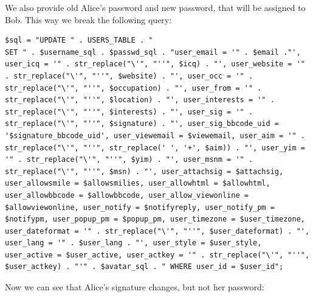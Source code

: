 \documentclass[12pt, a4paper]{article}
\begin{document}
We also provide old Alice's password and new password, that will be assigned to Bob. This way we break the following query:
\lstset{
	captionpos=b,
	frame=single,
	language=PHP,
	breaklines=true,
	label=sql12
}
\begin{lstlisting}
$sql = "UPDATE " . USERS_TABLE . "
SET " . $username_sql . $passwd_sql . "user_email = '" . $email ."', user_icq = '" . str_replace("\'", "''", $icq) . "', user_website = '" . str_replace("\'", "''", $website) . "', user_occ = '" . str_replace("\'", "''", $occupation) . "', user_from = '" . str_replace("\'", "''", $location) . "', user_interests = '" . str_replace("\'", "''", $interests) . "', user_sig = '" . str_replace("\'", "''", $signature) . "', user_sig_bbcode_uid = '$signature_bbcode_uid', user_viewemail = $viewemail, user_aim = '" . str_replace("\'", "''", str_replace(' ', '+', $aim)) . "', user_yim = '" . str_replace("\'", "''", $yim) . "', user_msnm = '" . str_replace("\'", "''", $msn) . "', user_attachsig = $attachsig, user_allowsmile = $allowsmilies, user_allowhtml = $allowhtml, user_allowbbcode = $allowbbcode, user_allow_viewonline = $allowviewonline, user_notify = $notifyreply, user_notify_pm = $notifypm, user_popup_pm = $popup_pm, user_timezone = $user_timezone, user_dateformat = '" . str_replace("\'", "''", $user_dateformat) . "', user_lang = '" . $user_lang . "', user_style = $user_style, user_active = $user_active, user_actkey = '" . str_replace("\'", "''", $user_actkey) . "'" . $avatar_sql . " WHERE user_id = $user_id";
\end{lstlisting}
Now we can see that Alice's signature changes, but not her password:\\
\end{document}
